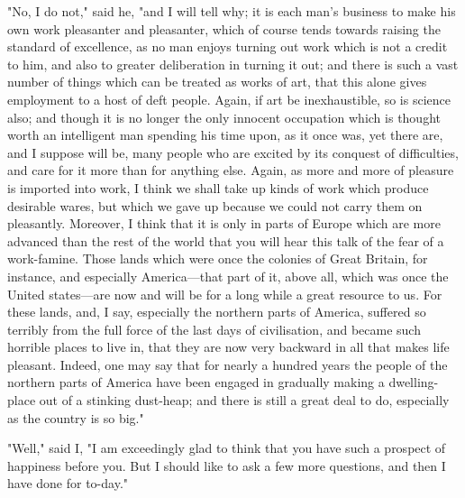 "No, I do not," said he, "and I will tell why; it is each man's business
to make his own work pleasanter and pleasanter, which of course tends
towards raising the standard of excellence, as no man enjoys turning out
work which is not a credit to him, and also to greater deliberation in
turning it out; and there is such a vast number of things which can be
treated as works of art, that this alone gives employment to a host of
deft people. Again, if art be inexhaustible, so is science also; and
though it is no longer the only innocent occupation which is thought
worth an intelligent man spending his time upon, as it once was, yet
there are, and I suppose will be, many people who are excited by its
conquest of difficulties, and care for it more than for anything else.
Again, as more and more of pleasure is imported into work, I think we
shall take up kinds of work which produce desirable wares, but which we
gave up because we could not carry them on pleasantly. Moreover, I think
that it is only in parts of Europe which are more advanced than the rest
of the world that you will hear this talk of the fear of a work-famine.
Those lands which were once the colonies of Great Britain, for instance,
and especially America---that part of it, above all, which was once the
United states---are now and will be for a long while a great resource to
us. For these lands, and, I say, especially the northern parts of
America, suffered so terribly from the full force of the last days of
civilisation, and became such horrible places to live in, that they are
now very backward in all that makes life pleasant. Indeed, one may say
that for nearly a hundred years the people of the northern parts of
America have been engaged in gradually making a dwelling-place out of a
stinking dust-heap; and there is still a great deal to do, especially as
the country is so big."

"Well," said I, "I am exceedingly glad to think that you have such a
prospect of happiness before you. But I should like to ask a few more
questions, and then I have done for to-day."
